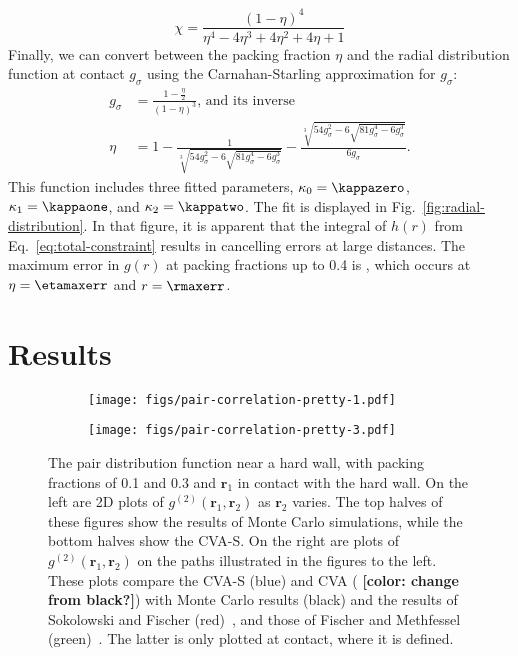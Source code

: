 \documentclass[letterpaper,twocolumn,amsmath,amssymb,pre,aps,10pt]{revtex4-1}
\newcommand{\red}[1]{{\bf \color{red} #1}}
\newcommand{\rr}{\textbf{r}}
\newcommand{\fixme}[1]{\red{[#1]}}
\begin{document}
\begin{equation}
  \chi = \frac{(1-\eta)^4}{\eta^4 - 4\eta^3 + 4\eta^2 + 4\eta + 1}
\end{equation}
Finally, we can convert between the packing fraction $\eta$ and the
radial distribution function at contact $g_\sigma$ using the
Carnahan-Starling approximation for $g_\sigma$:
\newcommand\nastyetacuberoot{\sqrt[3]{54 g_\sigma^2 -
    6\sqrt{81g_\sigma^4 - 6g_\sigma^3}}}
\begin{align}
  g_\sigma &= \frac{1-\tfrac{\eta}{2}}{(1-\eta)^3}\text{, and its inverse} \\
  \eta &= 1 - \frac{1}{\nastyetacuberoot} - \frac{\nastyetacuberoot}{6g_\sigma}.
\end{align}
This function includes three fitted parameters, $\kappaO =
\kappazero$, $\kappaI = \kappaone$,
and $\kappaZ = \kappatwo$.
The fit is displayed in Fig.~\ref{fig:radial-distribution}.  In that
figure, it is apparent that the integral of $h(r)$ from
Eq.~\ref{eq:total-constraint} results in cancelling errors at large
distances.  The maximum error in $g(r)$ at packing fractions up to
0.4 is \maxerr, which occurs at $\eta = \etamaxerr$ and $r =
\rmaxerr$.

\newcommand{\plotcomp}[1]{The top halves of these figures show the
  results of Monte Carlo simulations, while the bottom halves show the
  CVA-S.  On the right are plots of #1 on the paths illustrated in the
  figures to the left.  These plots compare the CVA-S (blue) and CVA
  (\fixme{color: change from black?}) with Monte Carlo results (black)
  and the results of Sokolowski and Fischer
  (red)~\cite{sokolowski1992role}, and those of Fischer and Methfessel
  (green)~\cite{fischer1980born}.  The latter is only plotted at
  contact, where it is defined}

\section{Results}

\begin{figure*}
  \begin{subfigure}{\textwidth}
    \texttt{[image: figs/pair-correlation-pretty-1.pdf]}
    \vspace{-0.6cm}
  \end{subfigure}
  \begin{subfigure}{\textwidth}
    \texttt{[image: figs/pair-correlation-pretty-3.pdf]}
    \vspace{-0.6cm}
  \end{subfigure}
  \caption{The pair distribution function near a hard wall, with
    packing fractions of 0.1 and 0.3 and $\rr_1$ in contact with the
    hard wall.  On the left are 2D plots of $g^{(2)}(\rr_1,\rr_2)$ as
    $\rr_2$ varies. \plotcomp{$g^{(2)}(\rr_1,\rr_2)$}.}
  \label{fig:pair-distribution}
\end{figure*}
\end{document}
